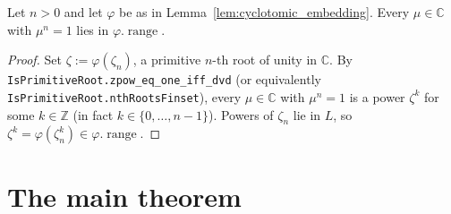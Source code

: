 \begin{lemma}
    \label{lem:range_contains_roots_of_unity}
    \leanok
    Let $n > 0$ and let $\varphi$ be as in
    Lemma~\ref{lem:cyclotomic_embedding}. Every $\mu \in \mathbb{C}$ with
    $\mu^n = 1$ lies in $\varphi.\operatorname{range}$.
\end{lemma}
\begin{proof}
    Set $\zeta := \varphi(\zeta_n)$, a primitive $n$-th root of unity in
    $\mathbb{C}$. By \texttt{IsPrimitiveRoot.zpow\_eq\_one\_iff\_dvd} (or
    equivalently \texttt{IsPrimitiveRoot.nthRootsFinset}), every
    $\mu \in \mathbb{C}$ with $\mu^n = 1$ is a power $\zeta^k$ for some
    $k \in \mathbb{Z}$ (in fact $k \in \{0, \dots, n-1\}$). Powers of $\zeta_n$
    lie in $L$, so $\zeta^k = \varphi(\zeta_n^k) \in \varphi.\operatorname{range}$.
\end{proof}

\section{The main theorem}

